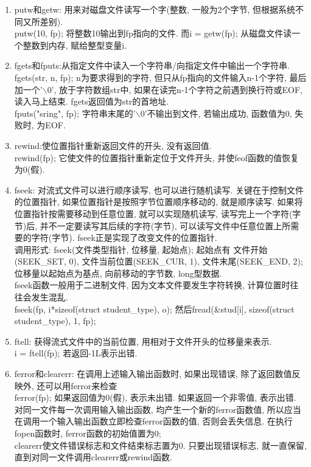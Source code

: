 \documentclass[a4paper,10pt,english]{article}
\begin{document}
\begin {enumerate}
\item {putw和getw}: 用来对磁盘文件读写一个字(整数, 一般为2个字节, 但根据系统不同又所差别). \\
putw(10, fp); 将整数10输出到fp指向的文件. 而i = getw(fp); 从磁盘文件读一个整数到内存, 赋给整型变量i.

\item {fgets和fputs}:从指定文件中读入一个字符串/向指定文件中输出一个字符串.\\
fgets(str, n, fp); n为要求得到的字符, 但只从fp指向的文件输入n-1个字符, 最后加一个'$\backslash 0$', 放于字符数组str中, 如果在读完n-1个字符之前遇到换行符或EOF, 读入马上结束. fgets返回值为str的首地址.\\
fputs("sring", fp); 字符串末尾的'$\backslash 0$'不输出到文件, 若输出成功, 函数值为0, 失败时, 为EOF.

\item {rewind}:使位置指针重新返回文件的开头, 没有返回值. \\
rewind(fp); 它使文件的位置指针重新定位于文件开头, 并使feof函数的值恢复为0(假).

\item {fseek}: 对流式文件可以进行顺序读写, 也可以进行随机读写. 关键在于控制文件的位置指针, 如果位置指针是按照字节位置顺序移动的, 就是顺序读写. 如果将位置指针按需要移动到任意位置, 就可以实现随机读写, 读写完上一个字符(字节)后, 并不一定要读写其后续的字符(字节), 可以读写文件中任意位置上所需要的字符(字节). fseek正是实现了改变文件的位置指针.\\
调用形式: fseek(文件类型指针, 位移量, 起始点); 起始点有 文件开始(SEEK\_SET, 0), 文件当前位置(SEEK\_CUR, 1), 文件末尾(SEEK\_END, 2); 位移量以起始点为基点, 向前移动的字节数, long型数据. \\
fseek函数一般用于二进制文件, 因为文本文件要发生字符转换, 计算位置时往往会发生混乱.\\
fseek(fp, i*sizeof(struct student\_type), o); 然后fread(\&stud[i], sizeof(struct student\_type), 1, fp);

\item {ftell}: 获得流式文件中的当前位置, 用相对于文件开头的位移量来表示. \\
i = ftell(fp); 若返回-1L表示出错.

\item {ferror和clearerr}: 在调用上述输入输出函数时, 如果出现错误, 除了返回数值反映外, 还可以用ferror来检查\\
ferror(fp); 如果返回值为0(假), 表示未出错. 如果返回一个非零值, 表示出错. 对同一文件每一次调用输入输出函数, 均产生一个新的ferror函数值, 所以应当在调用一个输入输出函数立即检查ferror函数的值, 否则会丢失信息. 在执行fopen函数时, ferror函数的初始值置为0;\\
clearerr使文件错误标志和文件结束标志置为0. 只要出现错误标志, 就一直保留, 直到对同一文件调用clearerr或rewind函数.

\end {enumerate}
\end{document}
